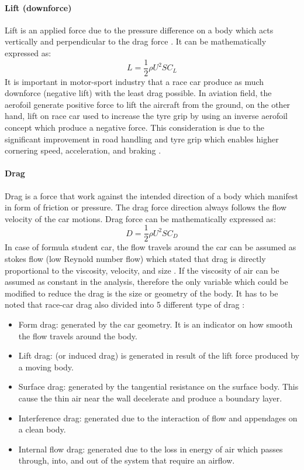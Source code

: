 \paragraph{Lift (downforce)}
Lift is an applied force due to the pressure difference on a body which acts vertically and perpendicular to the drag force \cite{Scibor-Rylski1984RoadAerodynamics}. It can be mathematically expressed as:
\begin{equation}
    L = \frac{1}{2}\rho U^2 S C_L
\end{equation}
It is important in motor-sport industry that a race car produce as much downforce (negative lift) with the least drag possible. In aviation field, the aerofoil generate positive force to lift the aircraft from the ground, on the other hand, lift on race car used to increase the tyre grip by using an inverse aerofoil concept which produce a negative force. This consideration is due to the significant improvement in road handling and tyre grip which enables higher cornering speed, acceleration, and braking \cite{Barnard1997RoadIntroduction}.


\paragraph{Drag}
Drag is a force that work against the intended direction of a body which manifest in form of friction or pressure\cite{Obidi2014TheoryVehicles}. The drag force direction always follows the flow velocity of the car motions. Drag force can be mathematically expressed as:
\begin{equation}
    D = \frac{1}{2}\rho U^2 S C_D
\end{equation}
In case of formula student car, the flow travels around the car can be assumed as stokes flow (low Reynold number flow) which stated that drag is directly proportional to the viscosity, velocity, and size \cite{Obidi2014TheoryVehicles}. If the viscosity of air can be assumed as constant in the analysis, therefore the only variable which could be modified to reduce the drag is the size or geometry of the body. It has to be noted that race-car drag also divided into 5 different type of drag \cite{Kelly1964AerodynamicsEngineers}:
\begin{itemize}
    \item Form drag:  generated by the car geometry. It is an indicator on how smooth the flow travels around the body.
    \item Lift drag:  (or induced drag) is generated in result of the lift force produced by a moving body. 
    \item Surface drag:  generated by the tangential resistance on the surface body. This cause the thin air near the wall decelerate and produce a boundary layer.
    \item Interference drag:  generated due to the interaction of flow and appendages on a clean body.
    \item Internal flow drag: generated due to the loss in energy of air which passes through, into, and out of the system that require an airflow.
\end{itemize}


